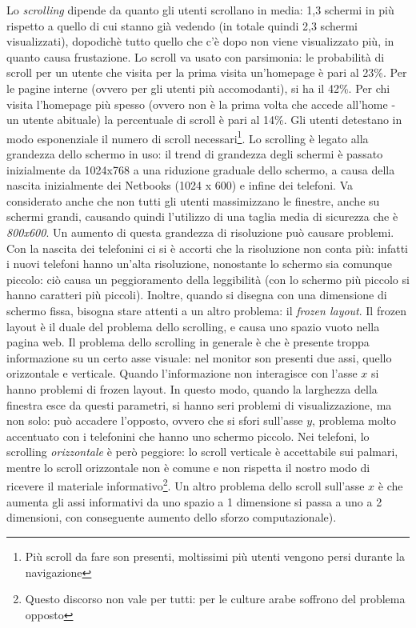 Lo \textit{scrolling} dipende da quanto gli utenti scrollano in media: 1,3 schermi in pi\`u rispetto a quello di cui stanno gi\`a vedendo (in totale quindi 2,3 schermi visualizzati), dopodich\`e tutto quello che c'\`e dopo non viene visualizzato pi\`u, in quanto causa frustazione. Lo scroll va usato con parsimonia: le probabilit\`a di scroll per un utente che visita per la prima visita un'homepage \`e pari al 23\%. Per le pagine interne (ovvero per gli utenti pi\`u accomodanti), si ha il 42\%. Per chi visita l'homepage pi\`u spesso (ovvero non \`e la prima volta che accede all'home - un utente abituale) la percentuale di scroll \`e pari al 14\%. Gli utenti detestano in modo esponenziale il numero di scroll necessari\footnote{Pi\`u scroll da fare son presenti, moltissimi pi\`u utenti vengono persi durante la navigazione}. Lo scrolling \`e legato alla grandezza dello schermo in uso: il trend di grandezza degli schermi \`e passato inizialmente da 1024x768 a una riduzione graduale dello schermo, a causa della nascita inizialmente dei Netbooks (1024 x 600) e infine dei telefoni. Va considerato anche che non tutti gli utenti massimizzano le finestre, anche su schermi grandi, causando quindi l'utilizzo di una taglia media di sicurezza che \`e \textit{800x600}. Un aumento di questa grandezza di risoluzione pu\`o causare problemi. Con la nascita dei telefonini ci si \`e accorti che la risoluzione non conta pi\`u: infatti i nuovi telefoni hanno un'alta risoluzione, nonostante lo schermo sia comunque piccolo: ci\`o causa un peggioramento della leggibilit\`a (con lo schermo pi\`u piccolo si hanno caratteri pi\`u piccoli). Inoltre, quando si disegna con una dimensione di schermo fissa, bisogna stare attenti a un altro problema: il \textit{frozen layout}. Il frozen layout \`e il duale del problema dello scrolling, e causa uno spazio vuoto nella pagina web. Il problema dello scrolling in generale \`e che \`e presente troppa informazione su un certo asse visuale: nel monitor son presenti due assi, quello orizzontale e verticale. Quando l'informazione non interagisce con l'asse $x$ si hanno problemi di frozen layout. In questo modo, quando la larghezza della finestra esce da questi parametri, si hanno seri problemi di visualizzazione, ma non solo: pu\`o accadere l'opposto, ovvero che si sfori sull'asse $y$, problema molto accentuato con i telefonini che hanno uno schermo piccolo.
Nei telefoni, lo scrolling \textit{orizzontale} \`e per\`o peggiore: lo scroll verticale \`e accettabile sui palmari, mentre lo scroll orizzontale non \`e comune e non rispetta il nostro modo di ricevere il materiale informativo\footnote{Questo discorso non vale per tutti: per le culture arabe soffrono del problema opposto}. Un altro problema dello scroll sull'asse $x$ \`e che aumenta gli assi informativi da uno spazio a 1 dimensione si passa a uno a 2 dimensioni, con conseguente aumento dello sforzo computazionale).
